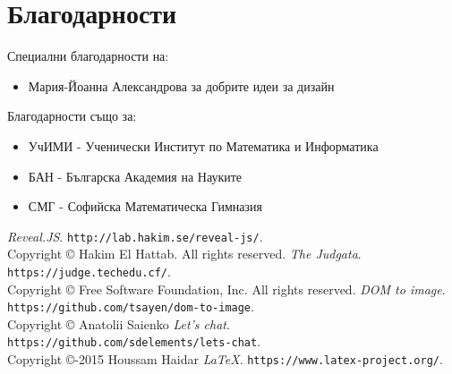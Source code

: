 \documentclass[28pt]{article}
\begin{document}
\section{Благодарности}
Специални благодарности на:
\begin{itemize}
	\item Мария-Йоанна Александрова за добрите идеи за дизайн
\end{itemize}
Благодарности също за:
\begin{itemize}
	\item УчИМИ - Ученически Институт по Математика и Информатика
	\item БАН - Българска Академия на Науките
	\item СМГ - Софийска Математическа Гимназия
\end{itemize}
\begin{thebibliography}{99}
\foreignlanguage{english}{
	{\itshape Reveal.JS}.
	\texttt{http://lab.hakim.se/reveal-js/}. \\
	Copyright \copyright{} Hakim El Hattab. All rights reserved.
	{\itshape The Judgata}.
	\texttt{https://judge.techedu.cf/}. \\
	Copyright \copyright{} Free Software Foundation, Inc. All rights reserved.
	{\itshape DOM to image}.
	\texttt{https://github.com/tsayen/dom-to-image}. \\
	Copyright \copyright{} Anatolii Saienko
	{\itshape Let's chat}.
	\texttt{https://github.com/sdelements/lets-chat}. \\
	Copyright \copyright{}-2015 Houssam Haidar
	{\itshape \LaTeX}.
	\texttt{https://www.latex-project.org/}.
}
\end{thebibliography}
\end{document}
